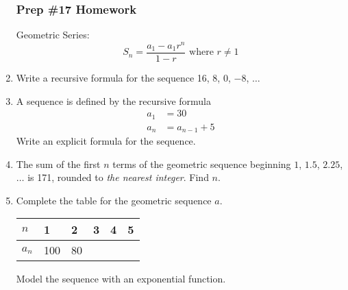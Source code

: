 \documentclass[12pt, twoside]{article}
\begin{document}
\begin{enumerate}[itemsep=0.5cm]
\newpage
\subsubsection*{Prep \#17 Homework}
Geometric Series:
$$S_n = \frac{a_1 - a_1 r^n}{1-r} \text{ where } r \ne 1$$

\item Write a recursive formula for the sequence 16, 8, 0, $-8$, $\ldots$ \vspace{2cm}

\item A sequence is defined by the recursive formula
\begin{align*}
a_1 &= 30 \\
a_{n} &= a_{n-1}+5
\end{align*}
Write an explicit formula for the sequence. \vspace{2cm}


\item The sum of the first $n$ terms of the geometric sequence beginning $1$, $1.5$, $2.25$, $\ldots$ is 171, rounded to \emph{the nearest integer}. Find $n$. \vspace{2cm}

\item Complete the table for the geometric sequence $a$.
    \begin{center}
    \begin{tabular}{|p{1cm}|p{1cm}|p{1cm}|p{1cm}|p{1cm}|p{1cm}|}
        \hline
        $n$ & 1 & 2 & 3 & 4 & 5 \\
        \hline
        $a_n$ & 100 & 80 & & & \\[0.25cm]
        \hline
    \end{tabular}
    \end{center}
    Model the sequence with an exponential function.



\end{enumerate}
\end{document}

